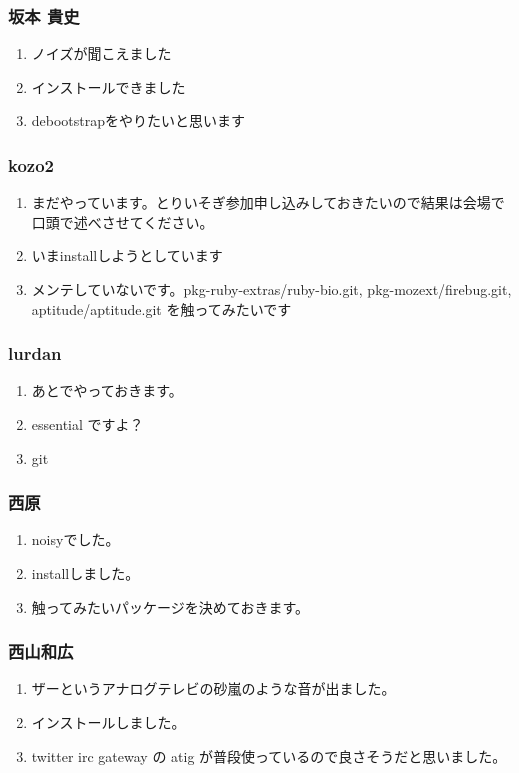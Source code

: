\documentclass[cjk,dvipdfmx,10pt,compress,%
hyperref={bookmarks=true,bookmarksnumbered=true,bookmarksopen=false,%
colorlinks=false,%
pdftitle={第 77 回 関西 Debian 勉強会},%
pdfauthor={倉敷・のがた・佐々木・かわだ・八津尾},%
pdfsubject={資料},%
}]{beamer}
\begin{document}

\begin{frame}
  \frametitle{ 坂本 貴史 }
  \begin{enumerate}
  \item ノイズが聞こえました
  \item インストールできました
  \item debootstrapをやりたいと思います
  \end{enumerate}
\end{frame}

\begin{frame}
  \frametitle{ kozo2 }
  \begin{enumerate}
  \item まだやっています。とりいそぎ参加申し込みしておきたいので結果は会場で口頭で述べさせてください。
  \item いまinstallしようとしています
  \item メンテしていないです。pkg-ruby-extras/ruby-bio.git, pkg-mozext/firebug.git, aptitude/aptitude.git を触ってみたいです
  \end{enumerate}
\end{frame}

\begin{frame}
  \frametitle{ lurdan }
  \begin{enumerate}
  \item あとでやっておきます。
  \item essential ですよ？
  \item git
  \end{enumerate}
\end{frame}

\begin{frame}
  \frametitle{ 西原 }
  \begin{enumerate}
  \item noisyでした。
  \item installしました。
  \item 触ってみたいパッケージを決めておきます。
  \end{enumerate}
\end{frame}

\begin{frame}
  \frametitle{ 西山和広 }
  \begin{enumerate}
  \item ザーというアナログテレビの砂嵐のような音が出ました。
  \item インストールしました。
  \item twitter irc gateway の atig が普段使っているので良さそうだと思いました。
  \end{enumerate}
\end{frame}
\end{document}
